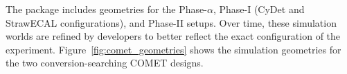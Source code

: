The \SimG package includes geometries for the Phase-$\alpha$, Phase-I (CyDet and StrawECAL configurations), and Phase-II setups. Over time, these simulation worlds are refined by developers to better reflect the exact configuration of the experiment. 
Figure~\ref{fig:comet_geometries} shows the simulation geometries for the two conversion-searching COMET designs.

\begin{figure}
    \centering
    \captionsetup[subfigure]{justification=centering}
    \noindent{}
    

\end{figure}

